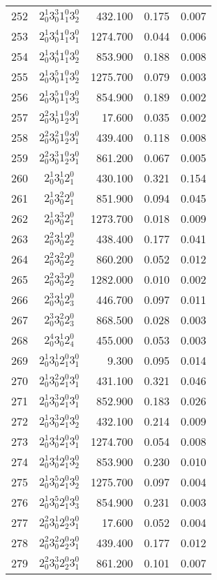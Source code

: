 \begin{table}
\begin{tabular}{rcrrr}
252&$2_0^1 3_0^3 1_1^0 3_2^0$& 432.100& 0.175& 0.007\\
253&$2_0^1 3_0^4 1_1^0 3_1^0$& 1274.700& 0.044& 0.006\\
254&$2_0^1 3_0^4 1_1^0 3_2^0$& 853.900& 0.188& 0.008\\
255&$2_0^1 3_0^5 1_1^0 3_2^0$& 1275.700& 0.079& 0.003\\
256&$2_0^1 3_0^5 1_1^0 3_3^0$& 854.900& 0.189& 0.002\\
257&$2_0^2 3_0^1 1_2^0 3_1^0$& 17.600& 0.035& 0.002\\
258&$2_0^2 3_0^2 1_2^0 3_1^0$& 439.400& 0.118& 0.008\\
259&$2_0^2 3_0^3 1_2^0 3_1^0$& 861.200& 0.067& 0.005\\
260&$2_0^1 3_0^1 2_1^0$& 430.100& 0.321& 0.154\\
261&$2_0^1 3_0^2 2_1^0$& 851.900& 0.094& 0.045\\
262&$2_0^1 3_0^3 2_1^0$& 1273.700& 0.018& 0.009\\
263&$2_0^2 3_0^1 2_2^0$& 438.400& 0.177& 0.041\\
264&$2_0^2 3_0^2 2_2^0$& 860.200& 0.052& 0.012\\
265&$2_0^2 3_0^3 2_2^0$& 1282.000& 0.010& 0.002\\
266&$2_0^3 3_0^1 2_3^0$& 446.700& 0.097& 0.011\\
267&$2_0^3 3_0^2 2_3^0$& 868.500& 0.028& 0.003\\
268&$2_0^4 3_0^1 2_4^0$& 455.000& 0.053& 0.003\\
269&$2_0^1 3_0^1 2_1^0 3_1^0$& 9.300& 0.095& 0.014\\
270&$2_0^1 3_0^2 2_1^0 3_1^0$& 431.100& 0.321& 0.046\\
271&$2_0^1 3_0^3 2_1^0 3_1^0$& 852.900& 0.183& 0.026\\
272&$2_0^1 3_0^3 2_1^0 3_2^0$& 432.100& 0.214& 0.009\\
273&$2_0^1 3_0^4 2_1^0 3_1^0$& 1274.700& 0.054& 0.008\\
274&$2_0^1 3_0^4 2_1^0 3_2^0$& 853.900& 0.230& 0.010\\
275&$2_0^1 3_0^5 2_1^0 3_2^0$& 1275.700& 0.097& 0.004\\
276&$2_0^1 3_0^5 2_1^0 3_3^0$& 854.900& 0.231& 0.003\\
277&$2_0^2 3_0^1 2_2^0 3_1^0$& 17.600& 0.052& 0.004\\
278&$2_0^2 3_0^2 2_2^0 3_1^0$& 439.400& 0.177& 0.012\\
279&$2_0^2 3_0^3 2_2^0 3_1^0$& 861.200& 0.101& 0.007\\

\end{tabular}
\end{table}
